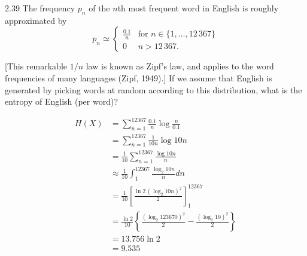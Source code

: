 \documentclass[12pt, a4paper]{article}
\begin{document}
\begin{prob}{2.39}
    The frequency $p_n$ of the $n$th most frequent word in English is roughly approximated by
    \begin{equation}
        p_n \simeq 
        \begin{cases} 
        \frac{0.1}{n} & \text{for } n \in \{1, \dots, 12\,367\} \\
        0 & n > 12\,367.
        \end{cases} \tag{2.56}
    \end{equation}
    
    [This remarkable $1/n$ law is known as Zipf's law, and applies to the word frequencies of many languages (Zipf, 1949).] If we assume that English is generated by picking words at random according to this distribution, what is the entropy of English (per word)? 

\end{prob}
\begin{sol}
    \begin{align*}
        H(X) &= \sum_{n=1}^{12367} \frac{0.1}{n} \log \frac{n}{0.1} \\
        &= \sum_{n=1}^{12367} \frac{1}{10n} \log 10n \\
        &= \frac{1}{10} \sum_{n=1}^{12367} \frac{\log 10n}{n} \\
        &\approx \frac{1}{10} \int_{1}^{12367} \frac{\log_2 10n}{n} dn \\
        &= \frac{1}{10} \left[ \frac{\ln 2 \, (\log_2 10n)^2}{2} \right]_1^{12367} \\
        &= \frac{\ln 2}{10} \left\{ \frac{(\log_2 123670)^2}{2} - \frac{(\log_2 10)^2}{2} \right\} \\
        &= 13.756 \ln 2 \\
        &= 9.535
    \end{align*}
\end{sol}
\bigskip

\end{document}
